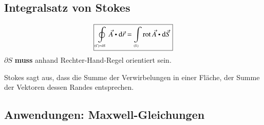 \subsection{Integralsatz von Stokes}
\[
    \boxed{\oint\limits_{\scriptscriptstyle (C) = \partial S} \vec{A} \dotp \diff \vec{r} = \int\limits_{\scriptscriptstyle (S)} \rot \vec{A} \dotp \diff \vec{S}}
\]
$\partial S$ \textbf{muss} anhand Rechter-Hand-Regel orientiert sein.

Stokes sagt aus, dass die Summe der Verwirbelungen in einer Fläche, der Summe der Vektoren dessen Randes entsprechen.

\subsection{Anwendungen: Maxwell-Gleichungen}


